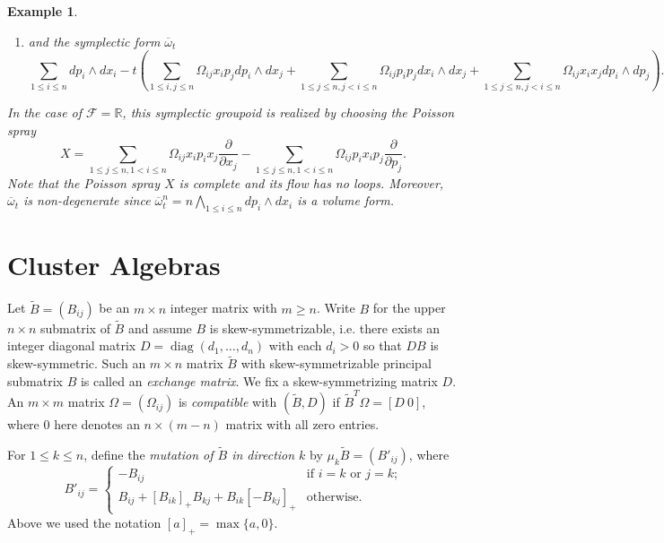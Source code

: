 \documentclass{amsart}
\newtheorem{example}[theorem]{Example}
\newcommand{\cF}{\mathcal{F}}
\newcommand{\RR}{\mathbb{R}}
\newcommand{\diag}{\operatorname{diag}}
\renewcommand{\max}{\operatorname{max}}
\begin{document}
\begin{example}
\begin{enumerate}
$$\begin{aligned}
				\end{aligned}
			$$
		\item and the symplectic form $\overline{\omega}_t$
		$$
			\sum_{1\leq i \leq n} dp_i \wedge dx_i
			- t \left(
			\sum_{1 \leq i, j \leq n} \Omega_{ij}x_i p_j d p_i \wedge d x_j 
			+ \sum_{1 \leq j \leq n, j < i \leq n} \Omega_{ij}p_ip_j d x_i \wedge d x_j
			+ \sum_{1 \leq j \leq n, j < i \leq n} \Omega_{ij}x_ix_j d p_i \wedge d p_j
			\right).
		$$
	\end{enumerate}
	In the case of $\cF = \RR$, this symplectic groupoid is realized by choosing the Poisson spray
	$$
		X = \sum_{1 \leq j \leq n, 1 < i \leq n}\Omega_{ij}x_ip_i x_j\frac{\partial}{\partial x_j} - \sum_{1 \leq j \leq n, 1 < i \leq n}\Omega_{ij}p_ix_i p_j\frac{\partial}{\partial p_j}.
	$$
	Note that the Poisson spray $X$ is complete and its flow has no loops. Moreover, $\overline{\omega}_t$ is non-degenerate since $\overline{\omega}_t^n = n \bigwedge\limits_{1\leq i\leq n} dp_i \wedge dx_i$ is a volume form.
\end{example}


\section{Cluster Algebras}

Let $\tilde B=(B_{ij})$ be an $m\times n$ integer matrix with $m\ge n$.  
Write $B$ for the upper $n\times n$ submatrix of $\tilde B$ and assume $B$ is skew-symmetrizable, i.e. there exists an integer diagonal matrix $D=\diag(d_1,\ldots,d_n)$ with each $d_i>0$ so that $DB$ is skew-symmetric. 
Such an $m\times n$ matrix $\tilde B$ with skew-symmetrizable principal submatrix $B$ is called an \emph{exchange matrix}.
We fix a skew-symmetrizing matrix $D$.
An $m\times m$ matrix $\Omega=(\Omega_{ij})$ is \emph{compatible} with $(\tilde B,D)$ if $\tilde B^T\Omega=[D\ 0]$, where $0$ here denotes an $n\times(m-n)$ matrix with all zero entries.

For $1\le k\le n$, define the \emph{mutation of $\tilde B$ in direction $k$} by $\mu_k\tilde B=(B'_{ij})$, where
\[B'_{ij}=\begin{cases}-B_{ij} & \text{if $i=k$ or $j=k$;}\\ B_{ij}+[B_{ik}]_+B_{kj}+B_{ik}[-B_{kj}]_+ & \text{otherwise.}\end{cases}\]
Above we used the notation $[a]_+=\max\{a,0\}$.
\end{document}
